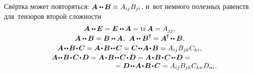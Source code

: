 \begin{otherlanguage}{russian}
Свёртка может повторяться: ${\bm{A} \dotdotp \hspace{-0.1ex} \bm{B} \equiv A_{ij} B_{ji}}$, и~вот немного полезных равенств для~тензоров второй сложности
\begin{equation}
\begin{array}{c}
\bm{A} \dotdotp \hspace{-0.1ex} \bm{E} = \bm{E} \dotdotp \hspace{-0.1ex} \bm{A} = \operatorname{tr} \bm{A} = A_{jj} \hspace{0.1ex} ,
\\[.2em]
%
\bm{A} \dotdotp \hspace{-0.1ex} \bm{B} = \bm{B} \dotdotp \hspace{-0.1ex} \bm{A} \hspace{0.1ex}, \:\,
\bm{A} \dotdotp \bm{B}^{\T} \hspace{-0.2ex} = \bm{A}^{\hspace{-0.16ex}\T} \hspace{-0.2ex} \dotdotp \bm{B} ,
\\[.2em]
%
\bm{A} \narrowdotdotp \bm{B} \narrowdotp \bm{C} = \bm{A} \narrowdotp \bm{B} \narrowdotdotp \hspace{0.1ex} \bm{C} = \bm{C} \narrowdotdotp \hspace{-0.1ex} \bm{A} \narrowdotp \bm{B} = A_{ij} B_{jk} C_{ki} \hspace{0.1ex} ,
\\[.15em]
%
\bm{A} \hspace{-0.1ex}\narrowdotdotp \bm{B} \narrowdotp \bm{C} \narrowdotp \bm{D} = \bm{A} \narrowdotp \bm{B} \narrowdotdotp \bm{C} \narrowdotp \bm{D} = \bm{A} \narrowdotp \bm{B} \narrowdotp \bm{C} \narrowdotdotp \bm{D} = \hspace*{2.5em} \\
\hspace{10.5em} = \bm{D} \narrowdotdotp \bm{A} \narrowdotp \bm{B} \narrowdotp \bm{C} = A_{ij} B_{jk} C_{kn} D_{ni} \hspace{0.1ex}.
\end{array}
\end{equation}

\end{otherlanguage}



